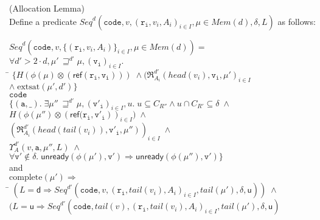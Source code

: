 \documentclass[preprint]{sigplanconf}
\newcommand{\betterstate}[3]{{#2}\, {\sqsupseteq}^{#1} {#3}}
\newcommand{\unready}[2]{\mathsf{unready}({#1}, {#2})}
\renewcommand{\implies}{\Rightarrow}
\newcommand{\term}[1]{\ensuremath{\mathtt{{#1}}}}
\newcommand{\Mem}[1]{\mathit{Mem}(#1)}
\newcommand{\Seq}{\mathit{Seq}}
\newcommand{\U}{\mathsf{u}}
\newcommand{\D}{\mathsf{d}}
\newcommand{\head}[1]{\mathit{head}(#1)}
\newcommand{\tail}[1]{\mathit{tail}(#1)}
\newcommand{\satisfyext}[2]{\mathrm{extsat}({#1}, {#2})}
\newcommand{\complete}[1]{\mathrm{complete}(#1)}
\begin{document}
\begin{lemma}{(Allocation Lemma)}\\
Define a predicate $\Seq^d(\term{code}, v, (\term{r_i}, v_i, A_i)_{i \in I}, \mu \in \Mem{d}, \delta, L)$ as follows: 
\begin{tabbing}
$\Seq^d(\term{code}, v, \{(\term{r_i}, v_i, A_i)\}_{i \in I}, \mu \in \Mem{d}) = $ \\
\;\; $\forall d' > 2\cdot d, \betterstate{d'}{\mu'}{\mu}, (\term{v_i})_{i \in I}.\;$ \\
\qquad\= $\{H(\phi(\mu) \otimes (\mathsf{ref}(\term{r_i, v_i}))) \;\land (\Re^{d'}_{A_i}(\head{v_i}, \term{v_i}, \mu')_{i \in I}$ \\
      \> \;\;$\land\;\satisfyext{\mu'}{d'}\}$ \\
\> \term{code} \\
\> $\{(\term{a}, \_).\;\exists$\=$\betterstate{d'}{\mu''}{\mu}, (\term{v'_i})_{i \in I}, u.\; u \subseteq C_{R''} \land u \cap C_{R'} \subseteq \delta \;\land$\\
\> \> $H(\phi(\mu'') \otimes (\mathsf{ref}\term{(r_i, v'_i}))_{i \in I}) \;\land$ \\
\> \> $(\Re^{d'}_{A_i}(\head{\tail{v_i}}, \term{v'_i}, \mu''))_{i \in I} \;\land$ \\
\> \> $\Upsilon^{d'}_A(v, \term{a}, \mu'', L) \;\land$ \\
\> \> $\forall \term{v'} \not\in \delta.\;\unready{\phi(\mu')}{\term{v'}} \implies \unready{\phi(\mu'')}{\term{v'}}\}$\\
\> and \\
\> $\complete{\mu'} \implies$ \\
\> \;\;\= $(L = \D \implies \Seq^{d'}(\term{code}, v, (\term{r_i}, \tail{v_i}, A_i)_{i \in I}, \tail{\mu'}, \delta, \U)) \;\land$ \\
\> \> $(L = \U \implies \Seq^{d'}(\term{code}, \tail{v}, (\term{r_i}, \tail{v_i}, A_i)_{i \in I}, \tail{\mu'}, \delta, \U)$ \\
\end{tabbing}


\end{lemma}
\end{document}
